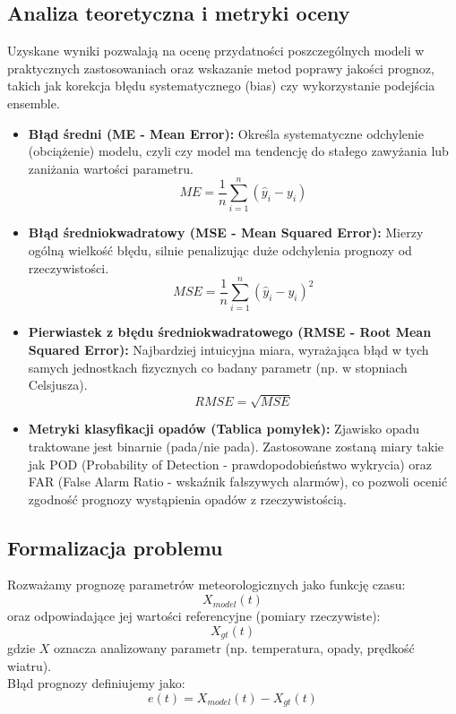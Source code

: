 \documentclass[a4paper,12pt]{article}
\begin{document}
\subsection{Analiza teoretyczna i metryki oceny}
Uzyskane wyniki pozwalają na ocenę przydatności poszczególnych modeli 
w praktycznych zastosowaniach oraz wskazanie metod poprawy jakości prognoz, 
takich jak korekcja błędu systematycznego (bias) czy wykorzystanie podejścia 
ensemble.
\begin{itemize}
    \item \textbf{Błąd średni (ME - Mean Error):} Określa systematyczne odchylenie (obciążenie) modelu, czyli czy model ma tendencję do stałego zawyżania lub zaniżania wartości parametru.
    $$ME = \frac{1}{n} \sum_{i=1}^{n} (\hat{y}_i - y_i)$$
    
    \item \textbf{Błąd średniokwadratowy (MSE - Mean Squared Error):} Mierzy ogólną wielkość błędu, silnie penalizując duże odchylenia prognozy od rzeczywistości.
    $$MSE = \frac{1}{n} \sum_{i=1}^{n} (\hat{y}_i - y_i)^2$$
    
    \item \textbf{Pierwiastek z błędu średniokwadratowego (RMSE - Root Mean Squared Error):} Najbardziej intuicyjna miara, wyrażająca błąd w tych samych jednostkach fizycznych co badany parametr (np. w stopniach Celsjusza).
    $$RMSE = \sqrt{MSE}$$
    
    \item \textbf{Metryki klasyfikacji opadów (Tablica pomyłek):} Zjawisko opadu traktowane jest binarnie (pada/nie pada). Zastosowane zostaną miary takie jak POD (Probability of Detection - prawdopodobieństwo wykrycia) oraz FAR (False Alarm Ratio - wskaźnik fałszywych alarmów), co pozwoli ocenić zgodność prognozy wystąpienia opadów z rzeczywistością.
\end{itemize}
\newpage
\subsection{Formalizacja problemu}

Rozważamy prognozę parametrów meteorologicznych jako funkcję czasu:
\[
X_{model}(t)
\]
oraz odpowiadające jej wartości referencyjne (pomiary rzeczywiste):
\[
X_{gt}(t)
\]
gdzie $X$ oznacza analizowany parametr (np. temperatura, opady, prędkość wiatru).
\\

\noindent
Błąd prognozy definiujemy jako:
\[
e(t) = X_{model}(t) - X_{gt}(t)
\]
\\
\end{document}
